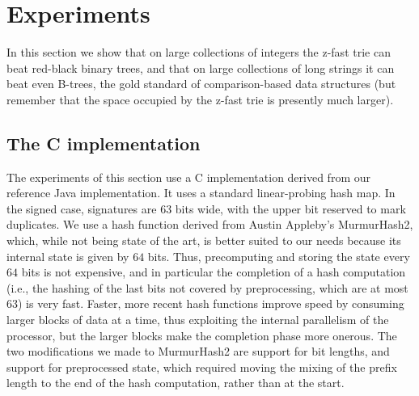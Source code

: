 \documentclass[a4paper]{article}
\newcommand{\?}{\mskip1.5mu}
\begin{document}
 

% 
% 
 


\section{Experiments}
\label{sec:experiments}

In this section we show that on large collections of integers the z-fast trie
can beat red-black binary trees, and that on large collections of long strings it
can beat even B-trees, the gold standard of comparison-based data structures
(but remember that the space occupied by the z-fast trie is presently much
larger).

\subsection{The C implementation}

The experiments of this section use a C implementation derived from our reference Java implementation. 
It uses a standard linear-probing hash map. In the signed case,
signatures are $63$ bits wide, with the upper bit reserved to mark duplicates. We use a
hash function derived from Austin Appleby's MurmurHash2, which, while not being state of the art,
is better suited to our needs because its internal state is given by $64$ bits. Thus,
precomputing and storing the state every $64$ bits is not expensive, and in particular
the completion of a hash computation (i.e., the hashing of the last bits not covered by preprocessing, which are at most $63$)
is very fast. Faster, more recent hash functions improve
speed by consuming larger blocks of data at a time, thus exploiting the internal parallelism
of the processor, but the larger blocks make the completion phase more onerous. The two modifications
we made to MurmurHash2 are support for bit lengths, and support for preprocessed state, which
required moving the mixing of the prefix length to the end of the hash computation, rather
than at the start. 
\end{document}
